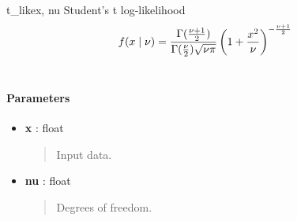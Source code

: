 \hypertarget{pymc.distributions.t_like}{}\begin{funcdesc}{t\_like}{x, nu}
Student's t log-likelihood
\begin{gather}
\begin{split}f(x \mid \nu) = \frac{\Gamma(\frac{\nu+1}{2})}{\Gamma(\frac{\nu}{2}) \sqrt{\nu\pi}} \left( 1 + \frac{x^2}{\nu} \right)^{-\frac{\nu+1}{2}}\end{split}\notag\\\begin{split}\end{split}\notag
\end{gather}\paragraph{Parameters}\begin{itemize}

\item[] \textbf{x} : float
\begin{quote}

Input data.
\end{quote}

\item[] \textbf{nu} : float
\begin{quote}

Degrees of freedom.
\end{quote}
\end{itemize}
\end{funcdesc}

